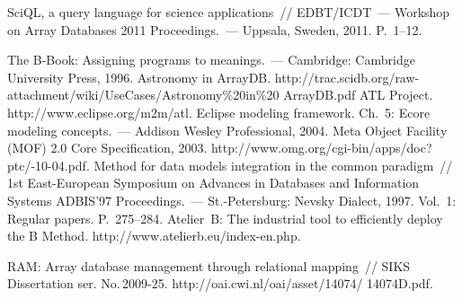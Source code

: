 \begin{multicols}{2}
{{\begin{thebibliography}{99}
 SciQL, a query language for science 
applications~// EDBT/ICDT~--- Workshop on Array Databases 2011 Proceedings.~--- Uppsala, 
Sweden, 2011. P.~1--12.

 The B-Book: Assigning programs to meanings.~--- Cambridge: Cambridge 
University Press, 1996.
Astronomy in ArrayDB. 
{\sf http://trac.scidb.org/\linebreak raw-attachment/wiki/UseCases/Astronomy\%20in\%20\linebreak
ArrayDB.pdf }
ATL Project. {\sf http://www.eclipse.org/m2m/atl}.
Eclipse modeling framework. Ch.~5: Ecore modeling concepts.~--- Addison Wesley 
Professional, 2004.
Meta Object Facility (MOF) 2.0 Core Specification, 2003. 
{\sf http://www.omg.org/cgi-bin/apps/doc?ptc/-10-04.pdf}. 
 Method for data models integration in the common paradigm~//  1st 
East-European Symposium on Advances in Databases and Information Systems \mbox{ADBIS'97} 
Proceedings.~--- St.-Petersburg: Nevsky Dialect, 1997. Vol.~1: Regular papers. P.~275--284.
Atelier~B: The industrial tool to efficiently deploy the B Method. 
{\sf http://www.atelierb.eu/index-en.php}.

\label{end\stat}

 RAM: Array database management through relational mapping~// SIKS 
Dissertation ser. No.\,2009-25. {\sf http://oai.cwi.nl/oai/asset/14074/ 14074D.pdf}.
         
\end{thebibliography}
} }

\end{multicols}